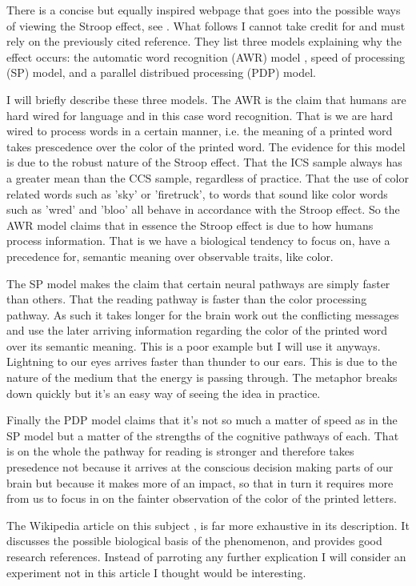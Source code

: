 \documentclass{article}
\begin{document}
There is a concise but equally inspired webpage that goes into the possible ways
of viewing the Stroop effect, see \cite{Stroop-background}.  What follows I
cannot take credit for and must rely on the previously cited reference.  They
list three models explaining why the effect occurs: the automatic word
recognition (AWR) model , speed of processing (SP) model, and a parallel
distribued processing (PDP) model.  

I will briefly describe these three models.  The AWR is the claim that humans
are hard wired for language and in this case word recognition.  That is we are
hard wired to process words in a certain manner, i.e. the meaning of a printed
word takes prescedence over the color of the printed word.  The evidence for
this model is due to the robust nature of the Stroop effect.  That the ICS
sample always has a greater mean than the CCS sample, regardless of practice.
That the use of color related words such as 'sky' or 'firetruck', to words that
sound like color words such as 'wred' and 'bloo' all behave in accordance with
the Stroop effect.  So the AWR model claims that in essence the Stroop effect is
due to how humans process information.  That is we have a biological tendency to
focus on, have a precedence for, semantic meaning over observable traits, like
color.

The SP model makes the claim that certain neural pathways are simply faster than
others.  That the reading pathway is faster than the color processing pathway.
As such it takes longer for the brain work out the conflicting messages and use
the later arriving information regarding the color of the printed word over its
semantic meaning.  This is a poor example but I will use it anyways.  Lightning
to our eyes arrives faster than thunder to our ears.  This is due to the nature
of the medium that the energy is passing through.  The metaphor breaks down
quickly but it's an easy way of seeing the idea in practice.

Finally the PDP model claims that it's not so much a matter of speed as in the
SP model but a matter of the strengths of the cognitive pathways of each.  That
is on the whole the pathway for reading is stronger and therefore takes
presedence not because it arrives at the conscious decision making parts of our
brain but because it makes more of an impact, so that in turn it requires more
from us to focus in on the fainter observation of the color of the printed
letters.

The Wikipedia article on this subject \cite{Stroop-wikipedia}, is far more
exhaustive in its description.  It discusses the possible biological basis of
the phenomenon, and provides good research references.  Instead of parroting any
further explication I will consider an experiment not in this article I thought
would be interesting.
\end{document}
